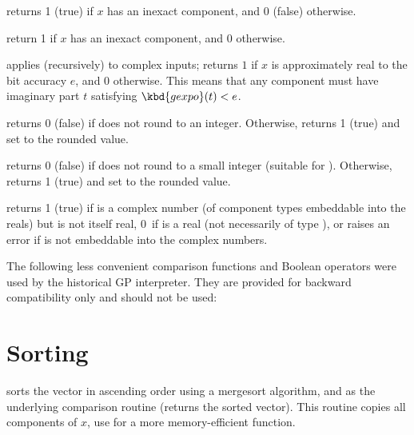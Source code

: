  returns 1 (true) if $x$ has an inexact
component, and 0 (false) otherwise.

 return 1 if $x$ has an inexact
 component, and 0  otherwise.

 applies (recursively) to complex inputs;
returns $1$ if $x$ is approximately real to the bit accuracy $e$, and 0
otherwise. This means that any  component must have imaginary part
$t$ satisfying $\kbd{gexpo}(t) < e$.

 returns 0 (false) if  does not round
to an integer. Otherwise, returns 1 (true) and set  to the rounded
value.

 returns 0 (false) if  does not
round to a small integer (suitable for ). Otherwise, returns 1
(true) and set  to the rounded value.

 returns 1 (true) if  is a complex number
(of component types embeddable into the reals) but is not itself real, 0~if
 is a real (not necessarily of type ), or raises an error if
 is not embeddable into the complex numbers.


The following less convenient comparison functions and Boolean operators were
used by the historical GP interpreter. They are provided for backward
compatibility only and should not be used:










\section{Sorting}


 sorts the vector  in ascending order using a
mergesort algorithm, and  as the underlying comparison routine
(returns the sorted vector). This routine copies all components of $x$, use
 for a more memory-efficient function.

